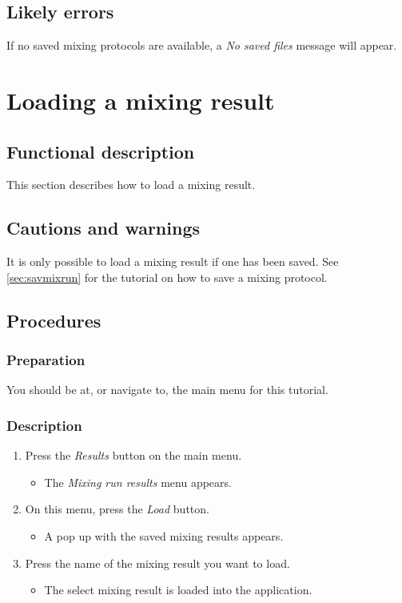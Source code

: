 \subsection{Likely errors}
If no saved mixing protocols are available, a \emph{No saved files} message will appear.


\section{Loading a mixing result}
\label{sec:loadMixResult}

\subsection{Functional description}
This section describes how to load a mixing result.

\subsection{Cautions and warnings}
It is only possible to load a mixing result if one has been saved. See \ref{sec:savmixrun} for the tutorial on how to save a mixing protocol.

\subsection{Procedures}
\subsubsection{Preparation}
You should be at, or navigate to, the main menu for this tutorial.

\subsubsection{Description}

\begin{enumerate}
	\item Press the \emph{Results} button on the main menu. 
		\begin{itemize}
           \item  The \emph{Mixing run results} menu appears.
		\end{itemize}
	\item On this menu, press the \emph{Load} button. 
		\begin{itemize}
            \item A pop up with the saved mixing results appears.
		\end{itemize}
	\item  Press the name of the mixing result you want to load.
		\begin{itemize}
           \item  The select mixing result is loaded into the application.
		\end{itemize}
\end{enumerate}

